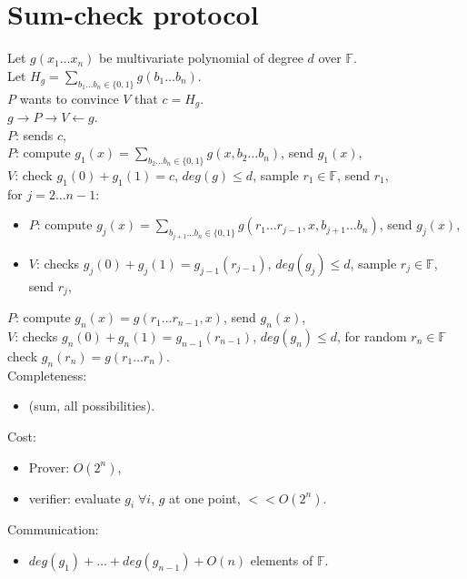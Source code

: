 \documentclass[a4paper, 12pt]{book}
\theoremstyle{definition}
\theoremstyle{remark}
\newcommand{\F}{\mathbb{F}}
\begin{document}
\section{Sum-check protocol}

Let $g(x_1 \dots x_n)$ be multivariate polynomial of degree $d$ over $\F$. \\
Let $H_g = \sum_{b_1 \dots b_n \in \{0, 1\}} g(b_1 \dots b_n)$. \\
$P$ wants to convince $V$ that $c = H_g $. \\
$g \to P \to V \leftarrow g$. \\
$P$: sends $c$, \\
$P$: compute $g_1(x) = \sum_{b_2 \dots b_n \in \{0, 1\}} g(x, b_2 \dots b_n)$, send $g_1(x)$, \\
$V$: check $g_1(0) + g_1(1) = c$, $deg(g) \leq d$, sample $r_1 \in \F$, send $r_1$, \\
for $j = 2 \dots n-1$:
\begin{itemize}[label={}]
  \item $P$: compute $g_j(x) = \sum_{b_{j+1} \dots b_n \in \{0, 1\}} g(r_1 \dots r_{j-1}, x, b_{j+1} \dots b_n)$, send $g_j(x)$,
  \item $V$: checks $g_j(0) + g_j(1) = g_{j-1}(r_{j-1})$, $deg(g_j) \leq d$, sample $r_j \in \F$, send $r_j$,
\end{itemize}
$P$: compute $g_n(x) = g(r_1 \dots r_{n-1}, x)$, send $g_n(x)$, \\
$V$: checks $g_n(0) + g_n(1) = g_{n-1}(r_{n-1})$, $deg(g_n) \leq d$, 
for random $r_n \in \F$ check $g_n(r_n) = g(r_1 \dots r_n)$. \\
Completeness:
\begin{itemize}[label={}]
  \item \checkmark (sum, all possibilities).
\end{itemize}
Cost:
\begin{itemize}[label={}]
  \item Prover: $O\left(2^n\right)$,
  \item verifier: evaluate $g_i \; \forall i$, $g$ at one point, $<< O\left(2^n\right)$.
\end{itemize}
Communication:
\begin{itemize}[label={}]
  \item $deg(g_1) + \dots + deg(g_{n-1}) + O(n)$ elements of $\F$.
\end{itemize}



%
%



\end{document}
